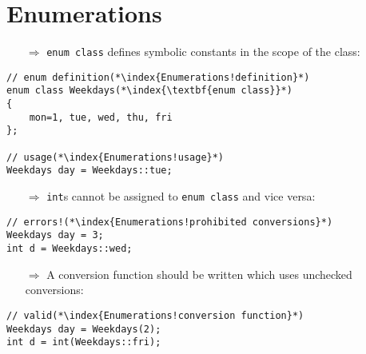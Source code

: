 \documentclass[10pt]{article}
\begin{document}
\section{Enumerations}
\small
\begin{enumerate}
\item[$\Rightarrow$] \texttt{enum class} defines symbolic constants in the scope of the class:
\end{enumerate}
\begin{lstlisting}
// enum definition(*\index{Enumerations!definition}*)
enum class Weekdays(*\index{\textbf{enum class}}*)
{
    mon=1, tue, wed, thu, fri
};

// usage(*\index{Enumerations!usage}*)
Weekdays day = Weekdays::tue;
\end{lstlisting}
\begin{enumerate}
\item[$\Rightarrow$] \texttt{int}s cannot be assigned to \texttt{enum class} and vice versa:
\end{enumerate}
\begin{lstlisting}
// errors!(*\index{Enumerations!prohibited conversions}*)
Weekdays day = 3;
int d = Weekdays::wed;
\end{lstlisting}
\begin{enumerate}
\item[$\Rightarrow$] A conversion function should be written which uses unchecked conversions:
\end{enumerate}
\begin{lstlisting}
// valid(*\index{Enumerations!conversion function}*)
Weekdays day = Weekdays(2);
int d = int(Weekdays::fri);
\end{lstlisting}
%
%
\end{document}
